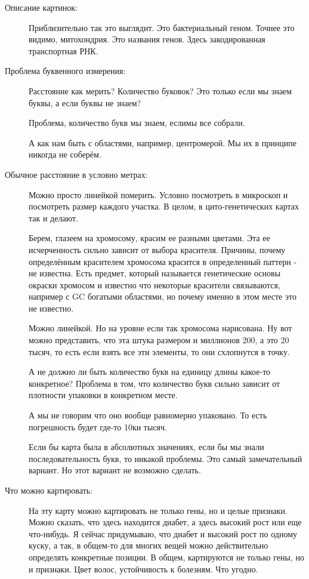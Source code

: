 \begin{description}
\item[Описание картинок:]
Приблизительно так это выглядит. 
Это бактериальный геном. Точнее это видимо, митохондрия. 
Это названия генов. Здесь закодированная транспортная РНК.

\item[Проблема буквенного измерения:]
Расстояние как мерить? Количество буковок?
Это только если мы знаем буквы, а если буквы не знаем?

Проблема, количество букв мы знаем, еслимы все собрали.

А как нам быть с областями, например, центромерой. Мы их в принципе никогда не соберём.

\item[Обычное расстояние в условно метрах:]
Можно просто линейкой померить. Условно посмотреть в микроскоп
и посмотреть размер каждого участка. В целом,
в цито-генетических картах так и делают.

Берем, глазеем на хромосому, красим ее разными цветами.
Эта ее исчерченность сильно зависит от выбора красителя.
Причины, почему определённым красителем хромосома красится в определенный паттерн -
не известна. Есть предмет, который называется
генетические основы окраски хромосом и известно
что некоторые красители связываются, например с GC богатыми
областями, но почему именно в этом месте это не известно.

Можно линейкой. Но на уровне если так
хромосома нарисована. Ну вот можно представить,
что эта штука размером и миллионов 200,
а это 20 тысяч, то есть если взять
все эти элементы, то они схлопнутся
в точку.

А не должно ли быть количество букв на единицу длины какое-то конкретное?
Проблема в том, что количество букв сильно зависит от плотности упаковки в
конкретном месте.

А мы не говорим что оно вообще равномерно упаковано. То есть
погрешность будет где-то 10ки тысяч.

Если бы карта была в абсолютных значениях,
если бы мы знали последовательность букв,
то никакой проблемы. Это самый замечательный вариант.
Но этот вариант не возможно сделать.
\item[Что можно картировать:]
На эту карту можно картировать не только гены, но и
целые признаки. Можно сказать, что здесь находится диабет,
а здесь высокий рост или еще что-нибудь.
Я сейчас придумываю, что диабет и высокий рост
по одному куску, а так, в общем-то
для многих
вещей можно действительно определять конкретные позиции.
В общем, картируются не только гены, но и признаки. Цвет
волос, устойчивость к болезням. Что угодно. 
\end{description}

